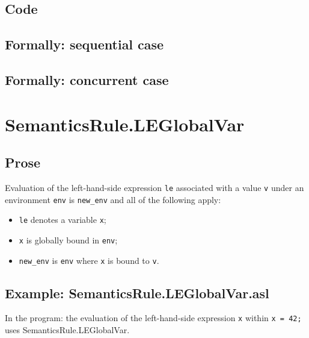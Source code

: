 \documentclass{book}
\begin{document}
  \subsection{Code}

\begin{emptyformal}
  \subsection{Formally: sequential case}

  \subsection{Formally: concurrent case}
\end{emptyformal}


\section{SemanticsRule.LEGlobalVar \label{sec:SemanticsRule.LEGlobalVar}}

    \subsection{Prose}
    Evaluation of the left-hand-side expression \texttt{le} associated with a
value \texttt{v} under an environment \texttt{env} is \texttt{new\_env} and all
of the following apply:
    \begin{itemize}
    \item \texttt{le} denotes a variable \texttt{x};
    \item \texttt{x} is globally bound in \texttt{env};
    \item \texttt{new\_env} is \texttt{env} where \texttt{x} is bound to \texttt{v}.
    \end{itemize}

    \subsection{Example: SemanticsRule.LEGlobalVar.asl}
    In the program:
    the evaluation of the left-hand-side expression \texttt{x} within \texttt{x = 42;} uses SemanticsRule.LEGlobalVar.
\end{document}
